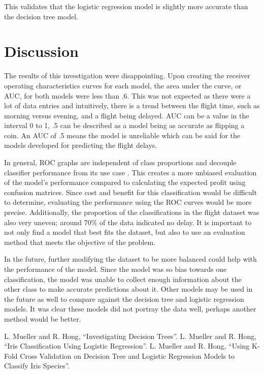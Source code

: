\documentclass[journal]{IEEEtran}
\begin{document}
This validates that the logistic regression model is slightly more accurate than the decision tree model. 

\section{Discussion}
\label{sec:discussion}

The results of this investigation were disappointing. Upon creating the receiver operating characteristics curves for each model, the area under the curve, or AUC, for both models were less than .6. This was not expected as there were a lot of data entries and intuitively, there is a trend between the flight time, such as morning versus evening, and a flight being delayed. AUC can be a value in the interval 0 to 1, .5 can be described as a model being as accurate as flipping a coin. An AUC of .5 means the model is unreliable which can be said for the models developed for predicting the flight delays. 

In general, ROC graphs are independent of class proportions and decouple classifier performance from its use case \cite{b1}. This creates a more unbiased evaluation of the model's performance compared to calculating the expected profit using confusion matrices. Since cost and benefit for this classification would be difficult to determine, evaluating the performance using the ROC curves would be more precise. Additionally, the proportion of the classifications in the flight dataset was also very uneven; around 70\% of the data indicated no delay. It is important to not only find a model that best fits the dataset, but also to use an evaluation method that meets the objective of the problem. 

In the future, further modifying the dataset to be more balanced could help with the performance of the model. Since the model was so bias towards one classification, the model was unable to collect enough information about the other class to make accurate predictions about it. Other models may be used in the future as well to compare against the decision tree and logistic regression models. It was clear these models did not portray the data well, perhaps another method would be better.

\begin{thebibliography}{00}
{L. Mueller and R. Hong, “Investigating Decision Trees”.}
{L. Mueller and R. Hong, “Iris Classification Using Logistic Regression”.}
{L. Mueller and R. Hong, “Using K-Fold Cross Validation on Decision Tree and Logistic Regression Models to Classify Iris Species”.}

\end{thebibliography}
\end{document}
